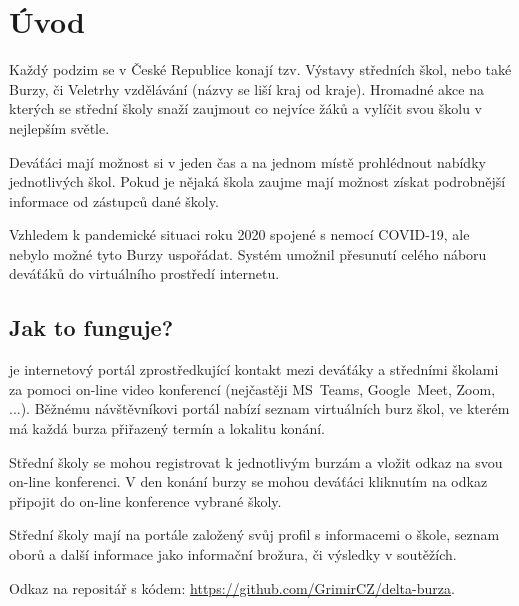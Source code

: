 \chapter*{Úvod}

Každý podzim se v České Republice konají tzv. Výstavy středních škol, nebo také Burzy, či Veletrhy vzdělávání (názvy se liší kraj od kraje). Hromadné akce na kterých se střední školy snaží zaujmout co nejvíce žáků  a vylíčit svou školu v nejlepším světle.

Deváťáci mají možnost si v jeden čas a na jednom místě prohlédnout nabídky jednotlivých škol. Pokud je nějaká škola zaujme mají možnost získat podrobnější informace od zástupců dané školy. 

Vzhledem k pandemické situaci roku 2020 spojené s nemocí COVID-19, ale nebylo možné tyto Burzy uspořádat. Systém \bso umožnil přesunutí celého náboru deváťáků do virtuálního prostředí internetu.

\section*{Jak to funguje?}
\bso je internetový portál zprostředkující kontakt mezi deváťáky a středními školami za pomoci on-line video konferencí (nejčastěji MS~Teams\cite{ms-teams}, Google~Meet\cite{google-meet}, Zoom\cite{zoom}, ...). Běžnému návštěvníkovi portál nabízí seznam virtuálních burz škol, ve kterém má každá burza přiřazený termín a lokalitu konání.

Střední školy se mohou registrovat k jednotlivým burzám a vložit odkaz na svou on-line konferenci. V den konání burzy se mohou deváťáci kliknutím na odkaz připojit do on-line konference vybrané školy.

Střední školy mají na portále založený svůj profil s informacemi o škole, seznam oborů a další informace jako informační brožura, či výsledky v soutěžích.

Odkaz na repositář s kódem: \href{https://github.com/GrimirCZ/delta-burza}{https://github.com/GrimirCZ/delta-burza}.

\pagebreak



